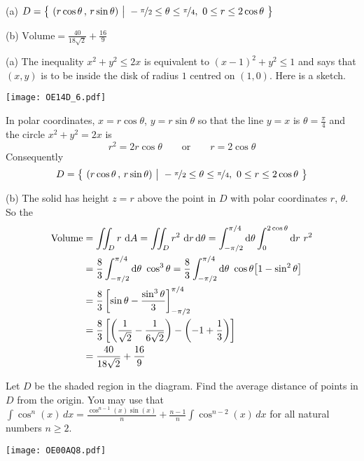 \begin{answer}
(a) $D = \big\{ \ (r\cos\theta\,,\,r\sin\theta)\ \big|\ -\nicefrac{\pi}{2}\le\theta\le\nicefrac{\pi}{4},\ 0\le r\le 2\cos\theta\ \big\}$

(b) $\text{Volume}=\frac{40}{18\sqrt{2}} +\frac{16}{9}$
\end{answer}

\begin{solution}
(a) The inequality $x^2 + y^2 \le 2x$ is equivalent to
$(x-1)^2 + y^2 \le 1$ and says that $(x,y)$ is to be inside the disk of
radius $1$ centred on $(1,0)$. Here is a sketch.

\begin{center}
\texttt{[image: OE14D\_6.pdf]}
\end{center}

In polar coordinates, $x=r\cos\theta$, $y=r\sin\theta$ so that 
the line $y=x$ is $\theta=\frac{\pi}{4}$
and the circle $x^2+y^2=2x$ is
\begin{equation*}
r^2=2r\cos\theta \qquad\text{or}\qquad r=2\cos\theta
\end{equation*}
Consequently
\begin{equation*}
D = \big\{ \ (r\cos\theta\,,\,r\sin\theta)\ \big|\ -\nicefrac{\pi}{2}\le\theta\le\nicefrac{\pi}{4},\ 0\le r\le 2\cos\theta\ \big\}
\end{equation*}

(b) The solid has height $z=r$ above the point in $D$ with polar coordinates
     $r$, $\theta$. So the 
\begin{align*}
\text{Volume}
&= \dblInt_D r\ \dee{A}=\dblInt_D r^2\ \dee{r}\, \dee{\theta}
=\int_{-\pi/2}^{\pi/4}\dee{\theta}\int_0^{2\cos\theta} \dee{r}\ r^2 \\
&= \frac{8}{3}\int_{-\pi/2}^{\pi/4}\dee{\theta}\ \cos^3\theta
= \frac{8}{3}\int_{-\pi/2}^{\pi/4}\dee{\theta}\ 
                         \cos\theta\big[1-\sin^2\theta\big] \\
&=\frac{8}{3} \left[\sin\theta -\frac{\sin^3\theta}{3}\right]_{-\pi/2}^{\pi/4}\\
&=\frac{8}{3}\left[\left(\frac{1}{\sqrt{2}} -\frac{1}{6\sqrt{2}}\right)
                   -\left(-1 + \frac{1}{3}\right)  \right] \\
&=\frac{40}{18\sqrt{2}} +\frac{16}{9}
\end{align*}
\end{solution}

\begin{question}[M200 2000A] %
Let $D$ be the shaded region in the diagram. Find the average 
distance of points in $D$ from the origin. You may use that
$\int\cos^n(x)\,dx = \frac{\cos^{n-1}(x)\sin(x)}{n}
                        +\frac{n-1}{n}\int\cos^{n-2}(x)\,dx$
for all natural numbers $n\ge 2$.
\begin{center}
     \texttt{[image: OE00AQ8.pdf]}
\end{center}
\end{question}

